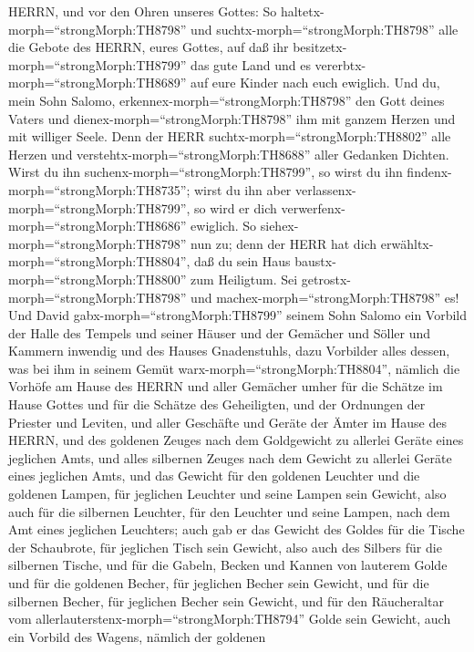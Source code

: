 HERRN, und vor den Ohren unseres Gottes: So
haltetx-morph=``strongMorph:TH8798'' und
suchtx-morph=``strongMorph:TH8798'' alle die Gebote des HERRN, eures
Gottes, auf daß ihr besitzetx-morph=``strongMorph:TH8799'' das gute Land
und es vererbtx-morph=``strongMorph:TH8689'' auf eure Kinder nach euch
ewiglich.  Und du, mein Sohn Salomo,
erkennex-morph=``strongMorph:TH8798'' den Gott deines Vaters und
dienex-morph=``strongMorph:TH8798'' ihm mit ganzem Herzen und mit
williger Seele. Denn der HERR suchtx-morph=``strongMorph:TH8802'' alle
Herzen und verstehtx-morph=``strongMorph:TH8688'' aller Gedanken
Dichten. Wirst du ihn suchenx-morph=``strongMorph:TH8799'', so wirst du
ihn findenx-morph=``strongMorph:TH8735''; wirst du ihn aber
verlassenx-morph=``strongMorph:TH8799'', so wird er dich
verwerfenx-morph=``strongMorph:TH8686'' ewiglich.  So
siehex-morph=``strongMorph:TH8798'' nun zu; denn der HERR hat dich
erwähltx-morph=``strongMorph:TH8804'', daß du sein Haus
baustx-morph=``strongMorph:TH8800'' zum Heiligtum. Sei
getrostx-morph=``strongMorph:TH8798'' und
machex-morph=``strongMorph:TH8798'' es!  Und David
gabx-morph=``strongMorph:TH8799'' seinem Sohn Salomo ein Vorbild der
Halle des Tempels und seiner Häuser und der Gemächer und Söller und
Kammern inwendig und des Hauses Gnadenstuhls,  dazu
Vorbilder alles dessen, was bei ihm in seinem Gemüt
warx-morph=``strongMorph:TH8804'', nämlich die Vorhöfe am Hause des
HERRN und aller Gemächer umher für die Schätze im Hause Gottes und für
die Schätze des Geheiligten,  und der Ordnungen der
Priester und Leviten, und aller Geschäfte und Geräte der Ämter im Hause
des HERRN,  und des goldenen Zeuges nach dem Goldgewicht zu
allerlei Geräte eines jeglichen Amts, und alles silbernen Zeuges nach
dem Gewicht zu allerlei Geräte eines jeglichen Amts,  und
das Gewicht für den goldenen Leuchter und die goldenen Lampen, für
jeglichen Leuchter und seine Lampen sein Gewicht, also auch für die
silbernen Leuchter, für den Leuchter und seine Lampen, nach dem Amt
eines jeglichen Leuchters;  auch gab er das Gewicht des
Goldes für die Tische der Schaubrote, für jeglichen Tisch sein Gewicht,
also auch des Silbers für die silbernen Tische,  und für
die Gabeln, Becken und Kannen von lauterem Golde und für die goldenen
Becher, für jeglichen Becher sein Gewicht, und für die silbernen Becher,
für jeglichen Becher sein Gewicht,  und für den
Räucheraltar vom allerlauterstenx-morph=``strongMorph:TH8794'' Golde
sein Gewicht, auch ein Vorbild des Wagens, nämlich der goldenen
